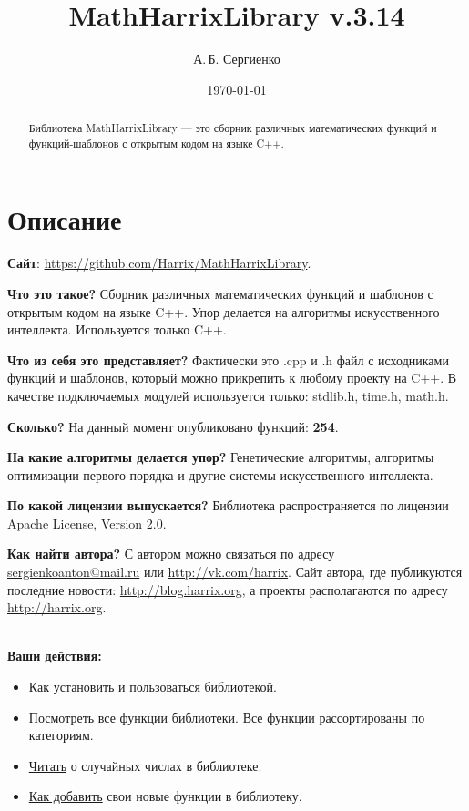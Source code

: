 \documentclass[a4paper,12pt]{article}
\title{MathHarrixLibrary v.3.14}
\author{А.\,Б. Сергиенко}
\date{\today}
\begin{document}


\maketitle

\begin{abstract}
Библиотека MathHarrixLibrary --- это сборник различных математических функций и функций-шаблонов с открытым кодом на языке C++.
\end{abstract}

\tableofcontents

\newpage

\section{Описание}

\textbf{Сайт}: \href{https://github.com/Harrix/MathHarrixLibrary}{https://github.com/Harrix/MathHarrixLibrary}.

\textbf{Что это такое?} Сборник различных математических функций и шаблонов с открытым кодом на языке C++. Упор делается на алгоритмы искусственного интеллекта. Используется только C++.

\textbf{Что из себя это представляет?} Фактически это .cpp и .h файл с исходниками функций и шаблонов, который можно прикрепить к любому проекту на C++. В качестве подключаемых модулей используется только: stdlib.h, time.h, math.h.

\textbf{Сколько?} На данный момент опубликовано функций: \textbf{254}.

\textbf{На какие алгоритмы делается упор?} Генетические алгоритмы, алгоритмы оптимизации первого порядка и другие системы искусственного интеллекта.

\textbf{По какой лицензии выпускается?} Библиотека распространяется по лицензии Apache License, Version 2.0.

\textbf{Как найти автора?} С автором можно связаться по адресу \href {mailto:sergienkoanton@mail.ru} {sergienkoanton@mail.ru} или  \href {http://vk.com/harrix} {http://vk.com/harrix}. Сайт автора, где публикуются последние новости: \href {http://blog.harrix.org} {http://blog.harrix.org}, а проекты располагаются по адресу \href {http://harrix.org} {http://harrix.org}.

~\\

\textbf{Ваши действия:}

\begin{itemize}
\item \hyperref[section_install]{Как установить} и пользоваться библиотекой.
\item \hyperref[section_listfunctions]{Посмотреть} все функции библиотеки. Все функции рассортированы по категориям.
\item \hyperref[section_random]{Читать} о случайных числах в библиотеке.
\item \hyperref[section_addnew]{Как добавить} свои новые функции в библиотеку.
\end{itemize}
\end{document}
